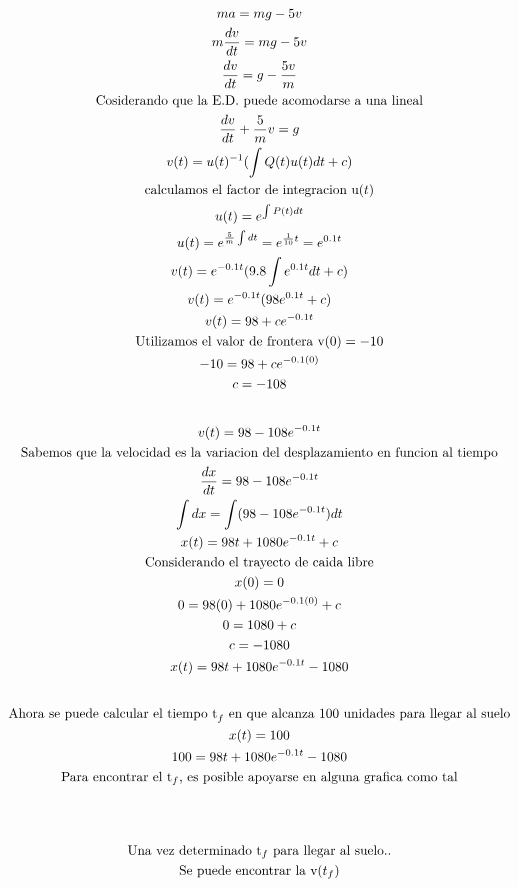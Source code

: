 \documentclass{article}
\begin{document}
\begin{gather*}
ma = mg-5v \\
m\frac{dv}{dt} = mg-5v \\
\frac{dv}{dt} = g-\frac{5v}{m} \\
\text{Cosiderando que la E.D. puede acomodarse a una lineal} \\
\frac{dv}{dt}  +\frac{5}{m}v =g \\
v(t) = u(t)^{-1}(\int Q(t)u(t)dt +c) \\
\text{calculamos el factor de integracion u}(t) \\
u(t) = e^{\int P(t)dt} \\
u(t) = e^{\frac{5}{m}\int dt} = e^{\frac{1}{10}t} = e^{0.1t} \\
v(t) = e^{-0.1t}(9.8\int e^{0.1t}dt +c)   \\
v(t) = e^{-0.1t}(98e^{0.1t}+c) \\
v(t) = 98+ce^{-0.1t} \\
\text{Utilizamos el valor de frontera v}(0) = -10 \\
-10 = 98+ce^{-0.1(0)} \\
c =-108 \\
\vspace{0.5em} \\
v(t) = 98-108e^{-0.1t} \\
\text{Sabemos que la velocidad es la variacion del desplazamiento en funcion al tiempo} \\
\frac{dx}{dt} = 98-108e^{-0.1t} \\
\int dx = \int (98-108e^{-0.1t})dt \\
x(t) = 98t+1080e^{-0.1t}+c \\
\text{Considerando el trayecto de caida libre} \\
x(0)=0 \\
0= 98(0)+1080e^{-0.1(0)}+c \\
0 = 1080+c \\
c = -1080 \\
x(t) = 98t+1080e^{-0.1t}-1080 \\
\vspace{0.5em} \\
\text{Ahora se puede calcular el tiempo t}_{f}\text{ en que alcanza 100 unidades para llegar al suelo} \\
x(t) = 100 \\
100 = 98t+1080e^{-0.1t}-1080 \\
\text{Para encontrar el t}_{f}\text{, es posible apoyarse en alguna grafica como tal} \\
\vspace{0.5em} \\
\vspace{0.5em} \\
\text{Una vez determinado t}_{f}\text{ para llegar al suelo..} \\
\text{Se puede encontrar la v}(t_{f}) 
\end{gather*}
\end{document}
